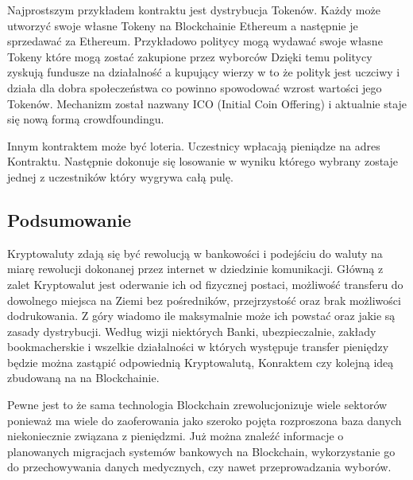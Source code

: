\documentclass[conference]{IEEEtran}
\begin{document}
Najprostszym przykładem kontraktu jest dystrybucja Tokenów. Każdy może utworzyć swoje własne Tokeny na Blockchainie
Ethereum a następnie je sprzedawać za Ethereum. Przykładowo politycy mogą wydawać swoje własne Tokeny które mogą zostać
zakupione przez wyborców Dzięki temu politycy zyskują fundusze na działalność a kupujący wierzy w to że polityk jest
uczciwy i działa dla dobra społeczeństwa co powinno spowodować wzrost wartości jego Tokenów. Mechanizm został nazwany
ICO (Initial Coin Offering) i aktualnie staje się nową formą crowdfoundingu.

Innym kontraktem może być loteria. Uczestnicy wpłacają pieniądze na adres Kontraktu. Następnie dokonuje się losowanie w
wyniku którego wybrany zostaje jednej z uczestników który wygrywa całą pulę.

\subsection*{Podsumowanie}

Kryptowaluty zdają się być rewolucją w bankowości i podejściu do waluty na miarę rewolucji dokonanej przez internet w
dziedzinie komunikacji. Główną z zalet Kryptowalut jest oderwanie ich od fizycznej postaci, możliwość transferu do
dowolnego miejsca na Ziemi bez pośredników, przejrzystość oraz brak możliwości dodrukowania. Z góry wiadomo ile
maksymalnie może ich powstać oraz jakie są zasady dystrybucji. Według wizji niektórych Banki, ubezpieczalnie, zakłady
bookmacherskie i wszelkie działalności w których występuje transfer pieniędzy będzie można zastąpić odpowiednią
Kryptowalutą, Konraktem czy kolejną ideą zbudowaną na na Blockchainie.

Pewne jest to że sama technologia Blockchain zrewolucjonizuje wiele sektorów ponieważ ma wiele do zaoferowania jako
szeroko pojęta rozproszona baza danych niekoniecznie związana z pieniędzmi. Już można znaleźć informacje o planowanych
migracjach systemów bankowych na Blockchain, wykorzystanie go do przechowywania danych medycznych, czy nawet
przeprowadzania wyborów.

%
%
\end{document}
